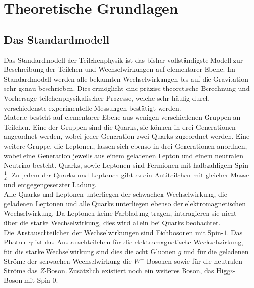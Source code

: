 \documentclass{include/thesisclass3}
\begin{document}
	\FrontMatter
	
	\tableofcontents                  
	\newpage
	\MainMatter


\chapter{Theoretische Grundlagen}

\section{Das Standardmodell}
Das Standardmodell der Teilchenphysik ist das bisher vollständigste Modell zur Beschreibung der Teilchen und Wechselwirkungen auf elementarer Ebene.
Im Standardmodell werden alle bekannten Wechselwirkungen bis auf die Gravitation sehr genau beschrieben.
Dies ermöglicht eine präzise theoretische Berechnung und Vorhersage teilchenphysikalischer Prozesse, welche sehr häufig durch verschiedenste experimentelle Messungen bestätigt werden.
\\
Materie besteht auf elementarer Ebene aus wenigen verschiedenen Gruppen an Teilchen.
Eine der Gruppen sind die Quarks, sie können in drei Generationen angeordnet werden, wobei jeder Generation zwei Quarks zugeordnet werden. 
Eine weitere Gruppe, die Leptonen, lassen sich ebenso in drei Generationen anordnen, wobei eine Generation jeweils aus einem geladenen Lepton und einem neutralen Neutrino besteht.
Quarks, sowie Leptonen sind Fermionen mit halbzahligem Spin-$\frac{1}{2}$. 
Zu jedem der Quarks und Leptonen gibt es ein Antiteilchen mit gleicher Masse und entgegengesetzter Ladung.\\
Alle Quarks und Leptonen unterliegen der schwachen Wechselwirkung, die geladenen Leptonen und alle Quarks unterliegen ebenso der elektromagnetischen Wechselwirkung.
Da Leptonen keine Farbladung tragen, interagieren sie nicht über die starke Wechselwirkung, dies wird allein bei Quarks beobachtet.\\
Die Austauschteilchen der Wechselwirkungen sind Eichbosonen mit Spin-$1$.
Das Photon~$\gamma$ ist das Austauschteilchen für die elektromagnetische Wechselwirkung, für die starke Wechselwirkung sind dies die acht Gluonen $g$ und für die geladenen Ströme der schwachen Wechselwirkung die $W^\pm$-Bosonen sowie für die neutralen Ströme das $Z$-Boson.
Zusätzlich existiert noch ein weiteres Boson, das Higgs-Boson mit Spin-$0$.
\end{document}
